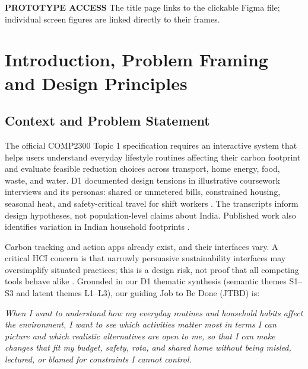 \documentclass[12pt,a4paper]{article}
\begin{document}

\par\vfill
\noindent{\color{RuleGray}\rule{\linewidth}{0.6pt}}\par\vspace{5pt}
{\sffamily\scriptsize\color{Slate}\textbf{\color{Teal}PROTOTYPE ACCESS}\enspace
The title page links to the clickable Figma file; individual screen figures are linked directly to their frames.}\par
\endgroup

\clearpage
{}
\setcounter{page}{1}

\section{Introduction, Problem Framing and Design Principles}

\subsection{Context and Problem Statement}
The official COMP2300 Topic 1 specification requires an interactive system that helps users understand everyday lifestyle routines affecting their carbon footprint and evaluate feasible reduction choices across transport, home energy, food, waste, and water. D1 documented design tensions in illustrative coursework interviews and its personas: shared or unmetered bills, constrained housing, seasonal heat, and safety-critical travel for shift workers \cite{d1report}. The transcripts inform design hypotheses, not population-level claims about India. Published work also identifies variation in Indian household footprints \cite{lee2021}. 

Carbon tracking and action apps already exist, and their interfaces vary. A critical HCI concern is that narrowly persuasive sustainability interfaces may oversimplify situated practices; this is a design risk, not proof that all competing tools behave alike \cite{brynjarsdottir2012}. Grounded in our D1 thematic synthesis (semantic themes S1--S3 and latent themes L1--L3), our guiding Job to Be Done (JTBD) is:
\begin{jtbox}
\itshape
When I want to understand how my everyday routines and household habits affect the environment, I want to see which activities matter most in terms I can picture and which realistic alternatives are open to me, so that I can make changes that fit my budget, safety, rota, and shared home without being misled, lectured, or blamed for constraints I cannot control.
\end{jtbox}
\end{document}
